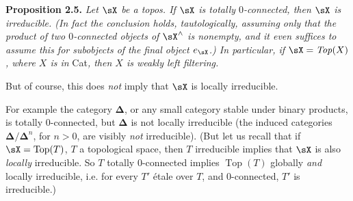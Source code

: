 \noindent\textbf{Proposition 2.5.} \textit{Let $\sX$ be a topos. If $\sX$ is totally $0$-connected, then $\sX$ is irreducible. (In fact the conclusion holds, tautologically, assuming only that the product of two $0$-connected objects of $\sX^{\wedge}$ is nonempty, and it even suffices to assume this for subobjects of the final object $e_{\sX}$.) In particular, if $\sX = \mathit{Top}(X)$, where $X$ is in} Cat\textit{, then $X$ is weakly left filtering.}

But of course, this does \textit{not} imply that $\sX$ is locally irreducible.


\noindent For example the category $\boldsymbol{\Delta}$, or any small category stable under binary products, is totally 0-connected, but $\boldsymbol{\Delta}$ is not locally irreducible (the induced categories $\boldsymbol{\Delta}/\boldsymbol{\Delta}^n$, for $n > 0$, are visibly \textit{not} irreducible). (But let us recall that if $\sX = \operatorname{Top}(T)$, $T$ a topological space, then $T$ irreducible implies that $\sX$ is also \textit{locally} irreducible. So $T$ totally 0-connected implies $\operatorname{Top}(T)$ globally \textit{and} locally irreducible, i.e. for every $T'$ étale over $T$, and 0-connected, $T'$ is irreducible.)

